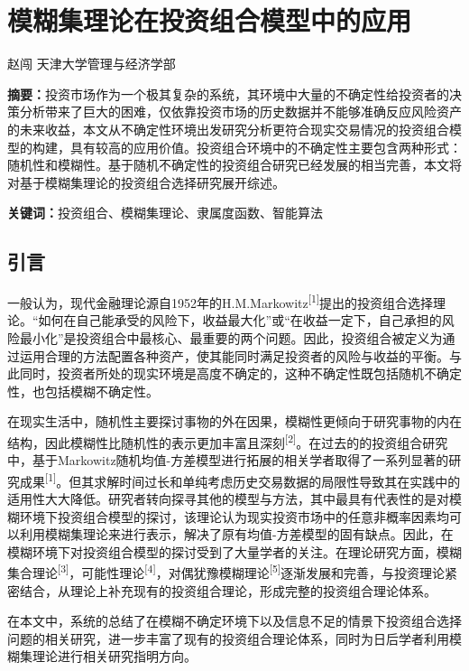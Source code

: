 \documentclass[]{article}
\date{}
\begin{document}
\hypertarget{header-n0}{%
\section{模糊集理论在投资组合模型中的应用}\label{header-n0}}
赵闯 天津大学管理与经济学部


\textbf{摘要：}投资市场作为一个极其复杂的系统，其环境中大量的不确定性给投资者的决策分析带来了巨大的困难，仅依靠投资市场的历史数据并不能够准确反应风险资产的未来收益，本文从不确定性环境出发研究分析更符合现实交易情况的投资组合模型的构建，具有较高的应用价值。投资组合环境中的不确定性主要包含两种形式：随机性和模糊性。基于随机不确定性的投资组合研究已经发展的相当完善，本文将对基于模糊集理论的投资组合选择研究展开综述。

\textbf{关键词：}投资组合、模糊集理论、隶属度函数、智能算法

\hypertarget{header-n4}{%
\subsection{引言}\label{header-n4}}

一般认为，现代金融理论源自1952年的H.M.Markowitz\textsuperscript{{[}1{]}}提出的投资组合选择理论。``如何在自己能承受的风险下，收益最大化''或``在收益一定下，自己承担的风险最小化''是投资组合中最核心、最重要的两个问题。因此，投资组合被定义为通过运用合理的方法配置各种资产，使其能同时满足投资者的风险与收益的平衡。与此同时，投资者所处的现实环境是高度不确定的，这种不确定性既包括随机不确定性，也包括模糊不确定性。

在现实生活中，随机性主要探讨事物的外在因果，模糊性更倾向于研究事物的内在结构，因此模糊性比随机性的表示更加丰富且深刻\textsuperscript{{[}2{]}}。在过去的的投资组合研究中，基于Markowitz随机均值-方差模型进行拓展的相关学者取得了一系列显著的研究成果\textsuperscript{{[}1{]}}。但其求解时间过长和单纯考虑历史交易数据的局限性导致其在实践中的适用性大大降低。研究者转向探寻其他的模型与方法，其中最具有代表性的是对模糊环境下投资组合模型的探讨，该理论认为现实投资市场中的任意非概率因素均可以利用模糊集理论来进行表示，解决了原有均值-方差模型的固有缺点。因此，在模糊环境下对投资组合模型的探讨受到了大量学者的关注。在理论研究方面，模糊集合理论\textsuperscript{{[}3{]}}，可能性理论\textsuperscript{{[}4{]}}，对偶犹豫模糊理论\textsuperscript{{[}5{]}}逐渐发展和完善，与投资理论紧密结合，从理论上补充现有的投资组合理论，形成完整的投资组合理论体系。

在本文中，系统的总结了在模糊不确定环境下以及信息不足的情景下投资组合选择问题的相关研究，进一步丰富了现有的投资组合理论体系，同时为日后学者利用模糊集理论进行相关研究指明方向。
\end{document}
